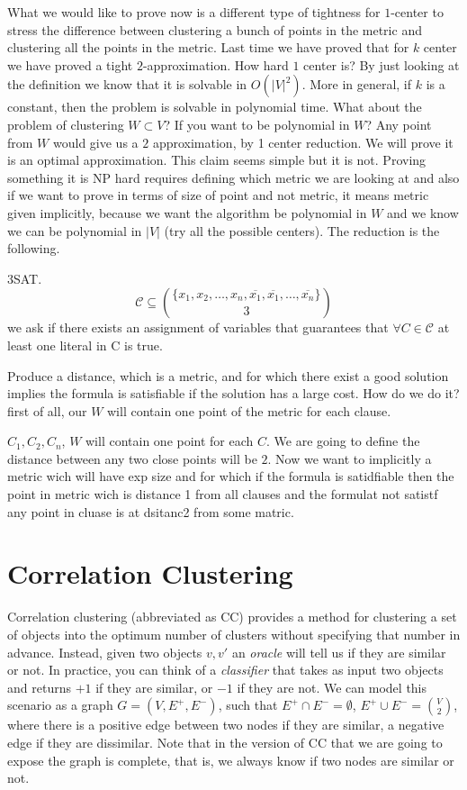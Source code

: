  What we would like to prove now is a different type of tightness for $1$-center to stress the difference between clustering a bunch of points in the metric and clustering all the points in the metric. Last time we have proved that for $k$ center we have proved a tight $2$-approximation. How hard $1$ center is? By just looking at the definition we know that it is solvable in $O(|V|^2)$. More in general, if $k$ is a constant, then the problem is solvable in polynomial time. What about the problem of clustering $W\subset V$? If you want to be polynomial in $W$? Any point from $W$ would give us a $2$ approximation, by 1 center reduction. We will prove it is an optimal approximation. This claim seems simple but it is not. Proving something it is NP hard requires defining which metric we are looking at and also if we want to prove in terms of size of point and not metric, it means metric given implicitly, because we want the algorithm be polynomial in $W$ and we know we can be polynomial in $|V|$ (try all the possible centers). The reduction is the following.
 
 3SAT. $$ \mathcal{C} \subseteq \binom{\{x_1, x_2, \ldots, x_n,\overline{x_1},\overline{x_1},\ldots, \overline{x_n}\}}{3}$$
 we ask if there exists an assignment of variables that guarantees that $\forall C \in \mathcal{C}$ at least one literal in C is true.
 
 Produce a distance, which is a metric, and for which there exist a good solution implies the formula is satisfiable if the solution has a large cost. How do we do it? first of all, our $W$ will contain one point of the metric for each clause. 
 
 $C_1, C_2, C_n$, $W$ will contain one point for each $C$. We are going to define the distance between any two close points will be $2$. Now we want to implicitly a metric wich will have exp size and for which if the formula is satidfiable then the point in metric wich is  distance 1 from all clauses and the formulat not satistf any point in cluase is at dsitanc2 from some matric.


\section{Correlation Clustering}

Correlation clustering (abbreviated as CC) provides a method for clustering a set of objects into the optimum number of clusters without specifying that number in advance. Instead, given two objects $v, v'$ an \emph{oracle} will tell us if they are similar or not. In practice, you can think of a \emph{classifier} that takes as input two objects and returns $+1$ if they are similar, or $-1$ if they are not. We can model this scenario as a graph $G=(V, E^+, E^-)$, such that $E^+ \cap E^- = \emptyset$, $E^+ \cup E^- = \binom{V}{2}$, where there is a positive edge between two nodes if they are similar, a negative edge if they are dissimilar. Note that in the version of CC that we are going to expose the graph is complete, that is, we always know if two nodes are similar or not.


